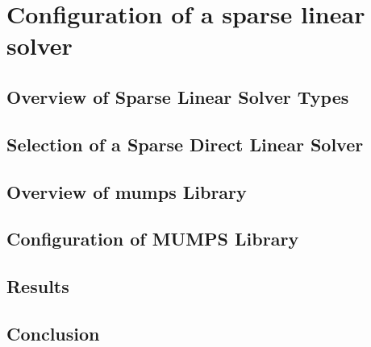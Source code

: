 \chapter{Configuration of a sparse linear solver}

	\section{Overview of Sparse Linear Solver Types} 

	
	
	

	\section{Selection of a Sparse Direct Linear Solver} \label{chapter:solver-selection}
	

	\section{Overview of \acrshort{mumps} Library}
	




	\section{Configuration of MUMPS Library} 
	\label{mumps:solver-configuration}
	
		
	
	
	

	\section{Results}
	

	\section{Conclusion}
	

